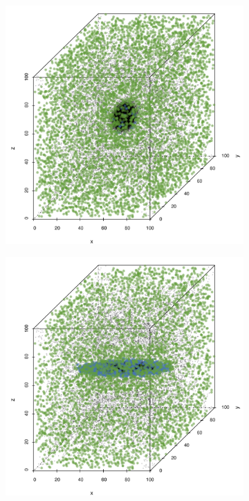 \begin{figure}
\begin{subfigure}{0.23\textwidth}
				\includegraphics[keepaspectratio=true, width=\textwidth, height=0.23\textheight]{discussion/img/ferdosi_1_60000_anisotropy.png}
				\caption{}
				\label{fig:discussion:anisotropy:baakman1}
			\end{subfigure}	
			\begin{subfigure}{0.23\textwidth}
				\centering
				\includegraphics[keepaspectratio=true, width=\textwidth, height=0.23\textheight]{discussion/img/baakman_4_60000_anisotropy.png}

\end{subfigure}
\end{figure}
